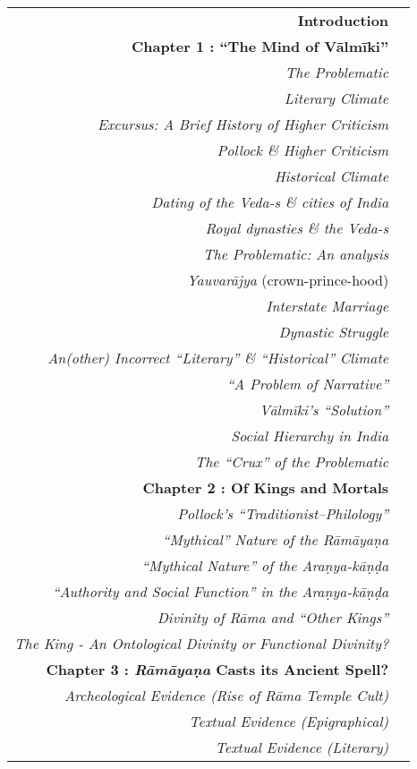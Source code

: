 {\renewcommand{\arraystretch}{1.25}
\begin{longtable}[r]{rr@{}}
{\bf Introduction} & \pageref{introduction}\\[7pt]
{\hfill\bfseries Chapter 1 : “The Mind of Vālmīki”} & \hfill\pageref{chapter1}\\
{\sl The Problematic} & \pageref{sec1.1}\\
{\sl Literary Climate} & \pageref{sec1.1.1}\\
{\sl Excursus: A   Brief History of Higher Criticism} & \pageref{sec1.1.1.1}\\
{\sl Pollock \& Higher Criticism} & \pageref{sec1.1.1.2}\\
{\sl Historical Climate} & \pageref{sec1.1.2}\\
{\sl Dating of the Veda-s \& cities of India} & \pageref{sec1.1.2.1}\\
{\sl Royal dynasties \& the Veda-s} & \pageref{sec1.1.2.3}\\
{\sl The Problematic: An analysis} & \pageref{sec1.2}\\
{\sl Yauvarājya} (crown-prince-hood) & \pageref{sec1.2.1}\\
{\sl Interstate Marriage} & \pageref{sec1.2.2}\\
{\sl Dynastic Struggle} & \pageref{sec1.2.3}\\
{\sl An(other) Incorrect “Literary” \& “Historical” Climate} & \pageref{sec1.2.3.1}\\
{\sl “A Problem of Narrative”} & \pageref{sec1.2.3.2}\\
{\sl Vālmīki’s “Solution”} & \pageref{sec1.3}\\
{\sl Social Hierarchy in India} & \pageref{sec1.3.1}\\
{\sl The “Crux” of the Problematic} & \pageref{sec1.4}\\[7pt]
{\hfill\bfseries Chapter 2 : Of Kings and Mortals} & \hfill\pageref{chapter2}\\
{\sl Pollock’s “Traditionist–Philology”} & \pageref{sec2.1}\\
{\sl “Mythical” Nature of the  Rāmāyaṇa} & \pageref{sec2.2}\\
{\sl “Mythical Nature” of the Araṇya-kāṇḍa} & \pageref{sec2.3}\\
{\sl “Authority and Social Function” in the Araṇya-kāṇḍa} & \pageref{sec2.3.1}\\
{\sl Divinity of Rāma and “Other Kings”} & \pageref{sec2.4}\\
{\sl The King - An Ontological Divinity or Functional Divinity?} & \pageref{sec2.5}\\[7pt]
{\hfill\bfseries Chapter 3 : {\sl\bfseries Rāmāyaṇa} Casts its Ancient Spell?} & \hfill\pageref{chapter3}\\
{\sl Archeological Evidence (Rise of Rāma Temple Cult)} & \pageref{sec3.1}\\
{\sl Textual Evidence (Epigraphical)} & \pageref{sec3.2}\\
{\sl Textual Evidence (Literary)} & \pageref{sec3.3}\\[7pt]
\end{longtable}}
